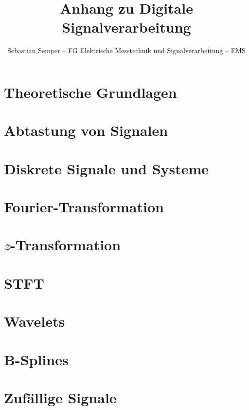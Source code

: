 \documentclass[ngerman]{article}
\title{Anhang zu Digitale Signalverarbeitung}
\author{Sebastian Semper -- FG Elektrische Messtechnik und Signalverarbeitung -- EMS}
\begin{document}

%
%
\section{Theoretische Grundlagen}\label{basics}
%

%
%
\section{Abtastung von Signalen}\label{sampling}
%

%
%
\section{Diskrete Signale und Systeme}\label{disc_sys}
%

%
%
\section{Fourier-Transformation}\label{fourier}
%

%
%
\section{\texorpdfstring{$z$}{z}-Transformation}\label{ztrafo}
%

%
%
\section{STFT}\label{stft}
%

%
%
\section{Wavelets}\label{wavelets}
%

%
%
\section{B-Splines}\label{bsplines}
%

%
%
\section{Zuf\"allige Signale}\label{random}
%

%
%
%
%
%

\end{document}
